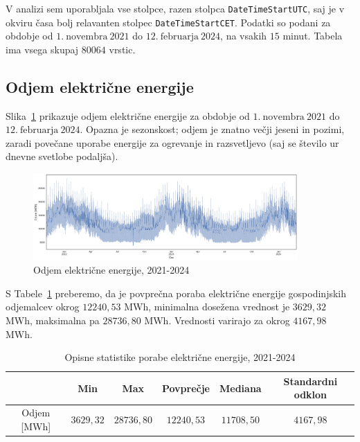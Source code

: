 \documentclass[a4paper, 11pt]{article}
\begin{document}
\noindent V analizi sem uporabljala vse stolpce, razen stolpca \texttt{DateTimeStartUTC}, saj je v 
okviru časa bolj relavanten stolpec \texttt{DateTimeStartCET}. Podatki so podani za obdobje od $1.~\text{novembra}~2021$ do $12.~\text{februarja}~2024$,
na vsakih $15$ minut. Tabela ima vsega skupaj $80064$ vrstic.


\subsection{Odjem električne energije}

\noindent Slika~\ref{fig:odjem_EE} prikazuje odjem električne energije za obdobje od 
$1.~\text{novembra}~2021$ do $12.~\text{februarja}~2024$. 
Opazna je sezonskost; odjem je znatno večji jeseni in pozimi, zaradi povečane uporabe energije za ogrevanje in 
razsvetljevo (saj se število ur dnevne svetlobe podaljša). \\

\begin{figure}[h!]
    \centering
    \caption{Odjem električne energije, 2021-2024}\par\medskip
    \label{fig:odjem_EE}
    \includegraphics[width=0.9\textwidth]{odjem_EE.png}
\end{figure}

\noindent S Tabele~\ref{Tab:opisne_statistike} preberemo, da je povprečna poraba električne energije gospodinjskih odjemalcev
okrog $12240{,}53 $ MWh, minimalna dosežena vrednost je $3629{,}32$ MWh, maksimalna pa $28736{,}80$ MWh. Vrednosti varirajo
za okrog $4167{,}98$ MWh. \\

\begin{table}[!h]
    \centering
    \caption{Opisne statistike porabe električne energije, 2021-2024}\par\medskip
    \label{Tab:opisne_statistike}
    \begin{tabular}{c||c|c|c|c|c}
              & Min & Max & Povprečje & Mediana & Standardni odklon \\ \hline \hline
        Odjem [MWh] & $3629{,}32$ & $28736{,}80$ & $12240{,}53$ & $11708{,}50$ & $4167{,}98$ \\ 
    \end{tabular}
\end{table}
\end{document}
